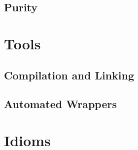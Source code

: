 \documentclass{beamer}
\begin{document}
\subsection{Purity}

\section{Tools}
\subsection{Compilation and Linking}
\subsection{Automated Wrappers}

\section{Idioms}

\begin{frame}
\end{frame}
\end{document}
